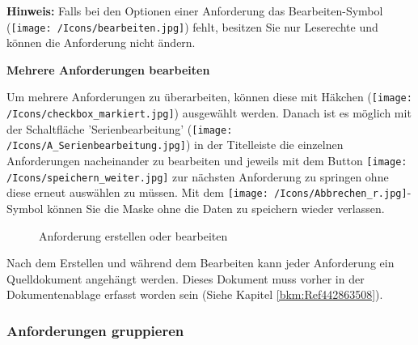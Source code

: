 \vspace{\baselineskip}

\textbf{Hinweis:} Falls bei den Optionen einer Anforderung das Bearbeiten-Symbol (\texttt{[image: /Icons/bearbeiten.jpg]}) fehlt, besitzen Sie nur Leserechte und können die Anforderung nicht ändern.

\clearpage
\textbf{Mehrere Anforderungen bearbeiten}

Um mehrere Anforderungen zu überarbeiten, können diese mit Häkchen (\texttt{[image: /Icons/checkbox\_markiert.jpg]}) ausgewählt werden. Danach ist es möglich mit der Schaltfläche 'Serienbearbeitung' (\texttt{[image: /Icons/A\_Serienbearbeitung.jpg]}) in der Titelleiste die einzelnen Anforderungen nacheinander zu bearbeiten und jeweils mit dem Button \texttt{[image: /Icons/speichern\_weiter.jpg]}  zur nächsten Anforderung zu springen ohne diese erneut auswählen zu müssen. Mit dem \texttt{[image: /Icons/Abbrechen\_r.jpg]}-Symbol  können Sie die Maske ohne die Daten zu speichern wieder verlassen. \\

\begin{figure}[H]
\caption{Anforderung erstellen oder bearbeiten}
\end{figure}

Nach dem Erstellen und während dem Bearbeiten kann jeder Anforderung ein Quelldokument angehängt werden. Dieses Dokument muss vorher in der Dokumentenablage erfasst worden sein (Siehe Kapitel \ref{bkm:Ref442863508}). 

\subsubsection{Anforderungen gruppieren}

